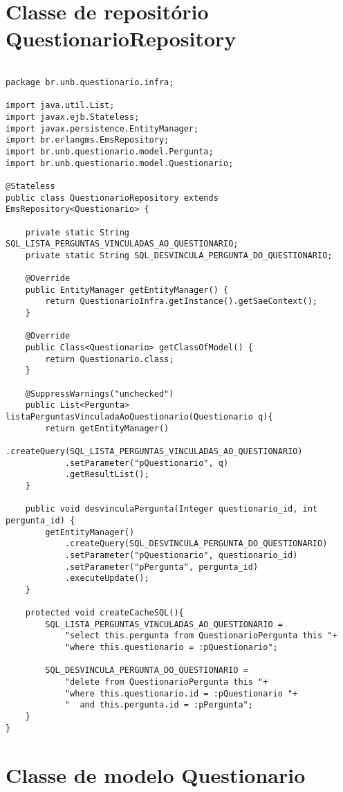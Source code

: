 \section{Classe de repositório QuestionarioRepository}

\begin{lstlisting} 

package br.unb.questionario.infra;

import java.util.List;
import javax.ejb.Stateless;
import javax.persistence.EntityManager;
import br.erlangms.EmsRepository;
import br.unb.questionario.model.Pergunta;
import br.unb.questionario.model.Questionario;

@Stateless
public class QuestionarioRepository extends EmsRepository<Questionario> {
	
	private static String SQL_LISTA_PERGUNTAS_VINCULADAS_AO_QUESTIONARIO;
	private static String SQL_DESVINCULA_PERGUNTA_DO_QUESTIONARIO;

	@Override
	public EntityManager getEntityManager() {
		return QuestionarioInfra.getInstance().getSaeContext();
	}

	@Override
	public Class<Questionario> getClassOfModel() {
		return Questionario.class;
	}
	
	@SuppressWarnings("unchecked")
	public List<Pergunta> listaPerguntasVinculadaAoQuestionario(Questionario q){
		return getEntityManager()
			.createQuery(SQL_LISTA_PERGUNTAS_VINCULADAS_AO_QUESTIONARIO)
			.setParameter("pQuestionario", q)
			.getResultList();
	}

	public void desvinculaPergunta(Integer questionario_id, int pergunta_id) {
		getEntityManager()
			.createQuery(SQL_DESVINCULA_PERGUNTA_DO_QUESTIONARIO)
			.setParameter("pQuestionario", questionario_id)
			.setParameter("pPergunta", pergunta_id)
			.executeUpdate();
	}
	
	protected void createCacheSQL(){
		SQL_LISTA_PERGUNTAS_VINCULADAS_AO_QUESTIONARIO = 
			"select this.pergunta from QuestionarioPergunta this "+
		    "where this.questionario = :pQuestionario";
		
		SQL_DESVINCULA_PERGUNTA_DO_QUESTIONARIO = 
			"delete from QuestionarioPergunta this "+
			"where this.questionario.id = :pQuestionario "+
			"  and this.pergunta.id = :pPergunta";
	}
}

\end{lstlisting}


\section{Classe de modelo Questionario}

